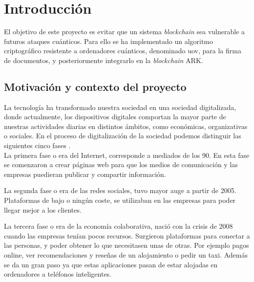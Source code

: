 \chapter{Introducción}

El objetivo de este proyecto es evitar que un sistema \textit{blockchain} sea vulnerable a futuros ataques cuánticos. Para ello se ha implementado un algoritmo criptográfico resistente a ordenadores cuánticos, denominado \acrshort{uov}, para la firma de documentos, y posteriormente integrarlo en la \textit{blockchain} ARK.

\section{Motivación y contexto del proyecto}
\label{sec:intro:motivacion} %


La tecnología ha transformado nuestra sociedad en una sociedad digitalizada, donde actualmente, los dispositivos digitales comportan la mayor parte de nuestras actividades diarias en distintos ámbitos, como económicas, organizativas o sociales. En el proceso de digitalización de la sociedad podemos distinguir las siguientes cinco fases \cite{fases-digitalizacion}.\\

La primera fase o era del Internet, corresponde a mediados de los 90. En esta fase se comenzaron a crear páginas web para que los medios de comunicación y las empresas puedieran publicar y compartir información.

La segunda fase o era de las redes sociales, tuvo mayor auge a partir de 2005. Plataformas de bajo o ningún coste, se utilizaban en las empresas para poder llegar mejor a los clientes.

La tercera fase o era de la economía colaborativa, nació con la crisis de  2008 cuando las empresas tenían pocos recursos. Surgieron plataformas para conectar a las personas, y poder obtener lo que necesitasen unas de otras. Por ejemplo pagos online, ver recomendaciones y reseñas de un alojamiento o pedir un taxi. Además se da un gran paso ya que estas aplicaciones pasan de estar  alojadas en ordenadores a teléfonos inteligentes.

